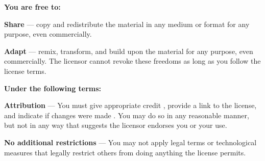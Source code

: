 \thispagestyle{empty}
\setcounter{page}{0}



\vspace{1.5cm}


\doclicenseThis

\vspace{1.5cm}

\noindent \textbf{\large You are free to:}

\vspace{0.25cm}

\noindent  \textbf{Share} — copy and redistribute the material in any medium or format for any purpose, even commercially.

\vspace{0.1cm}

\noindent  \textbf{Adapt} — remix, transform, and build upon the material for any purpose, even commercially. The licensor cannot revoke these freedoms as long as you follow the license terms.

\vspace{0.5cm}
\noindent \textbf{\large Under the following terms:}

\vspace{0.25cm}
 
\noindent \textbf{Attribution} — You must give appropriate credit , provide a link to the license, and indicate if changes were made . You may do so in any reasonable manner, but not in any way that suggests the licensor endorses you or your use.

\vspace{0.1cm}

\noindent \textbf{No additional restrictions} — You may not apply legal terms or technological measures that legally restrict others from doing anything the license permits.

